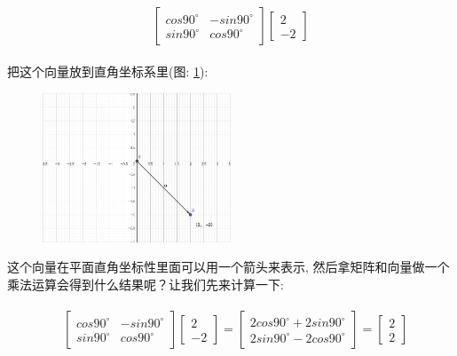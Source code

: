 \begin{align*}
  \begin{split}
    \begin{bmatrix} cos90^\circ & -sin90^\circ \\ sin90^\circ & cos90^\circ \end{bmatrix}
    \begin{bmatrix} 2 \\ -2 \end{bmatrix}
  \end{split}
\end{align*}

把这个向量放到直角坐标系里(图: \ref{fig:img4_1}):

\begin{figure}[ht]
  \centering
  \includegraphics[width=0.5\textwidth]{asset/20230825222021.png}
  \caption{}
  \label{fig:img4_1}
\end{figure}

这个向量在平面直角坐标性里面可以用一个箭头来表示, 然后拿矩阵和向量做一个乘法运算会得到什么结果呢？让我们先来计算一下:

\begin{align*}
  \begin{split}
    & \begin{bmatrix} cos90^\circ & -sin90^\circ \\ sin90^\circ & cos90^\circ \end{bmatrix}
    \begin{bmatrix} 2 \\ -2 \end{bmatrix} 
    = \begin{bmatrix} 2cos90^\circ + 2sin90^\circ \\ 2sin90^\circ - 2cos90^\circ \end{bmatrix} 
    = \begin{bmatrix} 2 \\ 2 \end{bmatrix}
  \end{split}
\end{align*}

